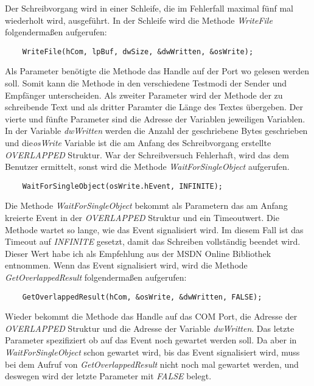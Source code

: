 Der Schreibvorgang wird in einer Schleife, die im Fehlerfall maximal fünf mal wiederholt wird, ausgeführt. In der Schleife wird die Methode \textit{WriteFile} folgendermaßen aufgerufen:
\begin{lstlisting}
	WriteFile(hCom, lpBuf, dwSize, &dwWritten, &osWrite);
\end{lstlisting}

Als Parameter benötigte die Methode das Handle auf der Port wo gelesen werden soll. Somit kann die Methode in den verschiedene Testmodi der Sender und Empfänger unterscheiden. Als zweiter Parameter wird der Methode der zu schreibende Text und als dritter Paramter die Länge des Textes übergeben. Der vierte und fünfte Parameter sind die Adresse der Variablen jeweiligen Variablen. In der Variable \textit{dwWritten} werden die Anzahl der geschriebene Bytes geschrieben und die\textit{osWrite} Variable ist die am Anfang des Schreibvorgang erstellte \textit{OVERLAPPED} Struktur. War der Schreibversuch Fehlerhaft, wird das dem Benutzer ermittelt, sonst wird die Methode \textit{WaitForSingleObject} aufgerufen.

\begin{lstlisting}
	WaitForSingleObject(osWrite.hEvent, INFINITE);
\end{lstlisting}

Die Methode \textit{WaitForSingleObject} bekommt als Parametern das am Anfang kreierte Event in der \textit{OVERLAPPED} Struktur und ein Timeoutwert. Die Methode wartet so lange, wie das Event signalisiert wird. Im diesem Fall ist das Timeout auf \textit{INFINITE} gesetzt, damit das Schreiben vollständig beendet wird. Dieser Wert habe ich als Empfehlung aus der MSDN Online Bibliothek\cite{SerialCommunications} entnommen. Wenn das Event signalisiert wird, wird die Methode \textit{GetOverlappedResult} folgendermaßen aufgerufen:

\begin{lstlisting}
	GetOverlappedResult(hCom, &osWrite, &dwWritten, FALSE);
\end{lstlisting}

Wieder bekommt die Methode das Handle auf das COM Port, die Adresse der \textit{OVERLAPPED} Struktur und die Adresse der Variable \textit{dwWritten}. Das letzte Parameter spezifiziert ob auf das Event noch gewartet werden soll. Da aber in \textit{WaitForSingleObject} schon gewartet wird, bis das Event signalisiert wird, muss bei dem Aufruf von \textit{GetOverlappedResult} nicht noch mal gewartet werden, und deswegen wird der letzte Parameter mit \textit{FALSE} belegt.\\


